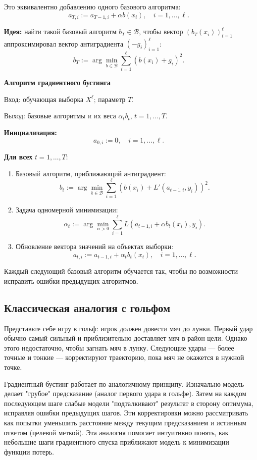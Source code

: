 Это эквивалентно добавлению одного базового алгоритма:
\[
    a_{T,i} := a_{T-1,i} + \alpha b(x_i), \quad i = 1, \dots, \ell.
\]

\textbf{Идея:} найти такой базовый алгоритм $b_T \in \mathcal{B}$, чтобы вектор $(b_T(x_i))_{i=1}^\ell$ аппроксимировал вектор антиградиента $(-g_i)_{i=1}^\ell$:
\[
    b_T := \arg\min_{b \in \mathcal{B}} \sum_{i=1}^\ell \left(b(x_i) + g_i \right)^2.
\]

\textbf{Алгоритм градиентного бустинга}

Вход: обучающая выборка $X^\ell$; параметр $T$.

Выход: базовые алгоритмы и их веса $\alpha_t b_t$, $t = 1, \dots, T$.

\textbf{Инициализация:}
\[
    a_{0,i} := 0, \quad i = 1, \dots, \ell.
\]

\textbf{Для всех} $t = 1, \dots, T$:
\begin{enumerate}
    \item Базовый алгоритм, приближающий антиградиент:
          \[
              b_t := \arg\min_{b \in \mathcal{B}} \sum_{i=1}^\ell \left(b(x_i) + L'(a_{t-1,i}, y_i) \right)^2.
          \]
    \item Задача одномерной минимизации:
          \[
              \alpha_t := \arg\min_{\alpha > 0} \sum_{i=1}^\ell L(a_{t-1,i} + \alpha b_t(x_i), y_i).
          \]
    \item Обновление вектора значений на объектах выборки:
          \[
              a_{t,i} := a_{t-1,i} + \alpha_t b_t(x_i), \quad i = 1, \dots, \ell.
          \]
\end{enumerate}

Каждый следующий базовый алгоритм обучается так, чтобы по возможности исправить ошибки предыдущих алгоритмов.

\subsection{Классическая аналогия с гольфом}

Представьте себе игру в гольф: игрок должен довести мяч до лунки. Первый удар обычно самый сильный и приблизительно доставляет мяч в район цели. Однако этого недостаточно, чтобы загнать мяч в лунку. Следующие удары — более точные и тонкие — корректируют траекторию, пока мяч не окажется в нужной точке.

Градиентный бустинг работает по аналогичному принципу. Изначально модель делает "грубое" предсказание (аналог первого удара в гольфе). Затем на каждом последующем шаге слабые модели "подталкивают" результат в сторону оптимума, исправляя ошибки предыдущих шагов. Эти корректировки можно рассматривать как попытки уменьшить расстояние между текущим предсказанием и истинным ответом (целевой меткой). Эта аналогия помогает интуитивно понять, как небольшие шаги градиентного спуска приближают модель к минимизации функции потерь.

